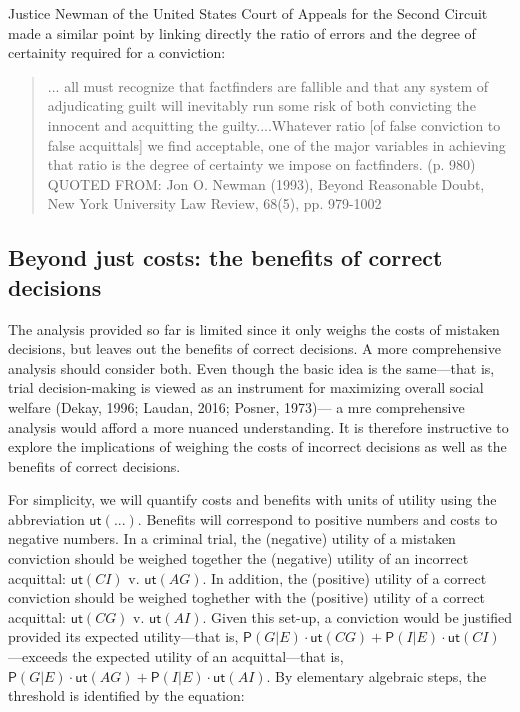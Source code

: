 \documentclass[10pt,dvipsnames,enabledeprecatedfontcommands]{scrartcl}
\newcommand{\pr}[1]{\mathsf{P}(#1)}
\newcommand{\ut}{\mathsf{ut}}
\begin{document}
\noindent
Justice Newman of the United States Court of Appeals for the Second
Circuit made a similar point by linking directly the ratio of errors and
the degree of certainity required for a conviction:

\begin{quote}
... all must recognize that factfinders are
fallible and that any system of adjudicating guilt will inevitably run some
risk of both convicting the innocent and acquitting the guilty....Whatever ratio [of false conviction to false acquittals] we find acceptable, one of the major variables in achieving that ratio is the degree of certainty we impose on factfinders. (p. 980)
QUOTED FROM: Jon O. Newman (1993), Beyond Reasonable Doubt, New York University Law Review, 68(5), pp. 979-1002
\end{quote}

\subsection{Beyond just costs: the benefits of correct
decisions}\label{beyond-just-costs-the-benefits-of-correct-decisions}

The analysis provided so far is limited since it only weighs the costs
of mistaken decisions, but leaves out the benefits of correct decisions.
A more comprehensive analysis should consider both. Even though the
basic idea is the same---that is, trial decision-making is viewed as an
instrument for maximizing overall social welfare (Dekay, 1996; Laudan,
2016; Posner, 1973)--- a mre comprehensive analysis would afford a more
nuanced understanding. It is therefore instructive to explore the
implications of weighing the costs of incorrect decisions as well as the
benefits of correct decisions.

For simplicity, we will quantify costs and benefits with units of
utility using the abbreviation \(\ut(...)\). Benefits will correspond to
positive numbers and costs to negative numbers. In a criminal trial, the
(negative) utility of a mistaken conviction should be weighed together
the (negative) utility of an incorrect acquittal: \(\ut(CI)\) v.
\(\ut(AG)\). In addition, the (positive) utility of a correct conviction
should be weighed toghether with the (positive) utility of a correct
acquittal: \(\ut(CG)\) v. \(\ut(AI)\). Given this set-up, a conviction
would be justified provided its expected utility---that is,
\(\pr{G | E} \cdot \ut(CG) + \pr{I | E } \cdot \ut(CI)\)---exceeds the
expected utility of an acquittal---that is,
\(\pr{G | E} \cdot \ut(AG) + \pr{I | E} \cdot \ut(AI)\). By elementary
algebraic steps, the threshold is identified by the equation:
\end{document}
